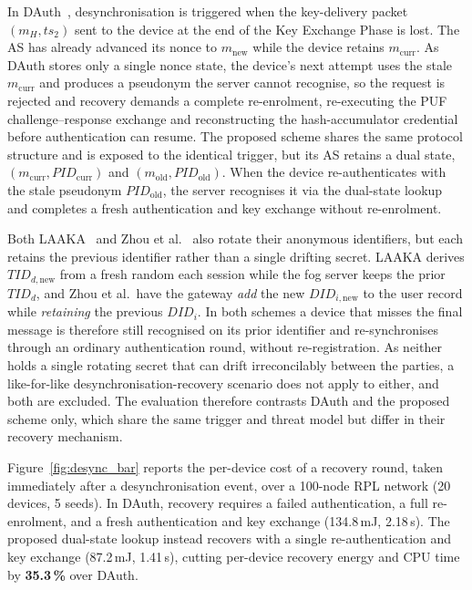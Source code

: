 In DAuth~\cite{das2026comsnets}, desynchronisation is triggered when the key-delivery
packet $(m_H, ts_2)$ sent to the device at the end of the Key Exchange Phase is lost.
The AS has already advanced its nonce to $m_{\mathrm{new}}$ while the device retains
$m_{\mathrm{curr}}$.
As DAuth stores only a single nonce state, the device's next attempt uses the stale
$m_{\mathrm{curr}}$ and produces a pseudonym the server cannot recognise, so the
request is rejected and recovery demands a complete re-enrolment, re-executing the
PUF challenge--response exchange and reconstructing the hash-accumulator credential
before authentication can resume.
The proposed scheme shares the same protocol structure and is exposed to the
identical trigger, but its AS retains a dual state,
$(m_{\mathrm{curr}}, \mathit{PID}_{\mathrm{curr}})$ and
$(m_{\mathrm{old}}, \mathit{PID}_{\mathrm{old}})$.
When the device re-authenticates with the stale pseudonym
$\mathit{PID}_{\mathrm{old}}$, the server recognises it via the dual-state lookup and
completes a fresh authentication and key exchange without re-enrolment.

Both LAAKA~\cite{ali2024laaka} and Zhou et al.~\cite{zhou2024auth} also rotate their
anonymous identifiers, but each retains the previous identifier rather than a single
drifting secret.
LAAKA derives $TID_{d,\mathrm{new}}$ from a fresh random each session while the fog
server keeps the prior $TID_d$, and Zhou et al.\ have the gateway \emph{add} the new
$DID_{i,\mathrm{new}}$ to the user record while \emph{retaining} the previous $DID_i$.
In both schemes a device that misses the final message is therefore still recognised
on its prior identifier and re-synchronises through an ordinary authentication round,
without re-registration.
As neither holds a single rotating secret that can drift irreconcilably between the
parties, a like-for-like desynchronisation-recovery scenario does not apply to either,
and both are excluded.
The evaluation therefore contrasts DAuth and the proposed scheme only, which share
the same trigger and threat model but differ in their recovery mechanism.

Figure~\ref{fig:desync_bar} reports the per-device cost of a recovery round, taken
immediately after a desynchronisation event, over a 100-node RPL network (20 devices,
5 seeds).
In DAuth, recovery requires a failed authentication, a full re-enrolment, and a fresh
authentication and key exchange (134.8\,mJ, 2.18\,s).
The proposed dual-state lookup instead recovers with a single re-authentication and
key exchange (87.2\,mJ, 1.41\,s), cutting per-device recovery energy and CPU time by
\textbf{35.3\,\%} over DAuth.

